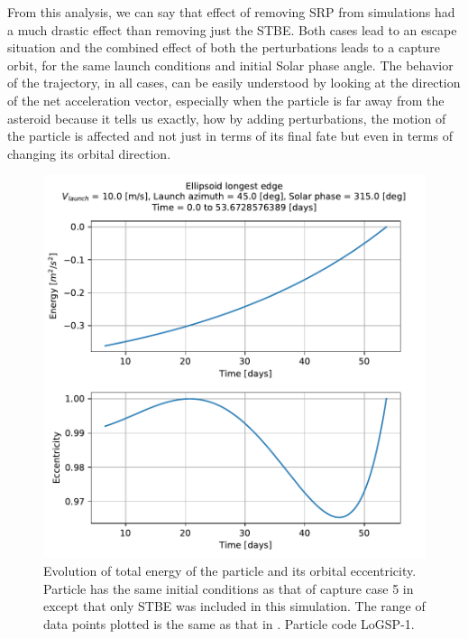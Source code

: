 From this analysis, we can say that effect of removing \gls{SRP} from simulations had a much drastic effect than removing just the \gls{STBE}. Both cases lead to an escape situation and the combined effect of both the perturbations leads to a capture orbit, for the same launch conditions and initial Solar phase angle. The behavior of the trajectory, in all cases, can be easily understood by looking at the direction of the net acceleration vector, especially when the particle is far away from the asteroid because it tells us exactly, how by adding perturbations, the motion of the particle is affected and not just in terms of its final fate but even in terms of changing its orbital direction.
\begin{figure}[htb]
\centering
\captionsetup{justification=centering}
\includegraphics[width=\linewidth, height=0.45\textheight, keepaspectratio=true]{longest_edge_perturbations/3.2Density_1cmSize/10ms_45Azimuth_315SolarPhase/noSRP_eccentricity_energy.pdf}
\caption{Evolution of total energy of the particle and its orbital eccentricity. Particle has the same initial conditions as that of capture case 5 in  except that only \gls{STBE} was included in this simulation. The range of data points plotted is the same as that in . Particle code LoGSP-1.}
\label{fig:LoGSP_1_capture_case_5_eccentricity_energy_noSRP}
\end{figure}
